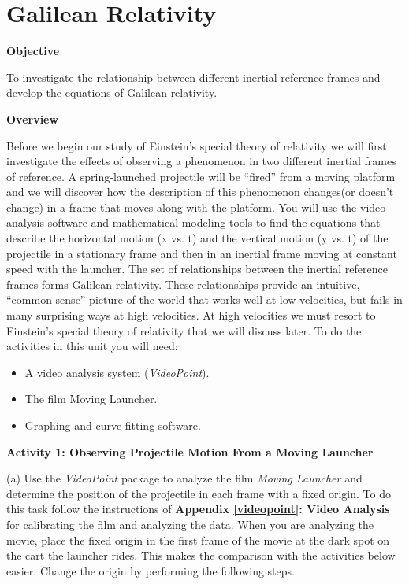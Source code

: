 
\section{Galilean Relativity}

\makelabheader %

\textbf{Objective }

To investigate the relationship between different inertial reference
frames and develop the equations of Galilean relativity.

\textbf{Overview}

Before we begin our study of Einstein's special theory of relativity
we will first investigate the effects of observing a phenomenon in
two different inertial frames of reference. A spring-launched projectile
will be {}``fired'' from a moving platform and we will discover
how the description of this phenomenon changes(or doesn't change)
in a frame that moves along with the platform. You will use the video
analysis software and mathematical modeling tools to find the equations
that describe the horizontal motion (x vs. t) and the vertical motion
(y vs. t) of the projectile in a stationary frame and then in an inertial
frame moving at constant speed with the launcher. The set of relationships
between the inertial reference frames forms Galilean relativity. These
relationships provide an intuitive, {}``common sense'' picture of
the world that works well at low velocities, but fails in many surprising
ways at high velocities. At high velocities we must resort to Einstein's
special theory of relativity that we will discuss later. To do the
activities in this unit you will need:

\begin{itemize}
\item A video analysis system (\emph{VideoPoint}).
\item The film Moving Launcher.
\item Graphing and curve fitting software.
\end{itemize}
\textbf{Activity 1: Observing Projectile Motion From a Moving Launcher}

(a) Use the \emph{VideoPoint} package to analyze the film \emph{Moving
Launcher} and determine the position of the projectile in each frame
with a fixed origin. To do this task follow the instructions of \textbf{Appendix
\ref{videopoint}: Video Analysis} for calibrating the film and analyzing the data.
When you are analyzing the movie, place the fixed origin in the first
frame of the movie at the dark spot on the cart the launcher rides.
This makes the comparison with the activities below easier. Change
the origin by performing the following steps.

